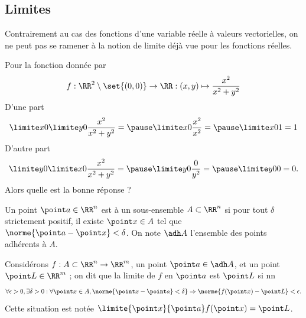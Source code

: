 \subsection{Limites}
\begin{frame}
  \begin{remark*}
    Contrairement au cas des fonctions d'une variable réelle à valeurs vectorielles, on ne peut pas se ramener à la notion de limite déjà vue pour les fonctions réelles.
  \end{remark*}\pause{}

  \begin{example}
    Pour la fonction donnée par
    \begin{equation*}
      f : \RR^{2}\setminus\set{(0,0)} \to \RR : (x,y) \mapsto \frac{x^{2}}{x^{2} + y^{2}}
    \end{equation*}
    D'une part
    \begin{equation*}
      \limite x 0  \limite y 0  \frac{x^{2}}{x^{2} + y^{2}} = \pause
      \limite x 0   \frac{x^{2}}{x^{2}} = \pause
      \limite x 0 1 = 1
    \end{equation*}\pause{}
    D'autre part
    \begin{equation*}
      \limite y 0 \limite x 0  \frac{x^{2}}{x^{2} + y^{2}} = \pause
      \limite y 0 \frac{0}{y^{2}} = \pause
      \limite y 0 0 = 0.
    \end{equation*}\pause{}
    Alors quelle est la bonne réponse ?
  \end{example}
\end{frame}
\begin{frame}
\begin{definition}
  Un point \(\point a \in \RR^{n}\) est  à un sous-ensemble \(A\subset \RR^{n}\) si\pause{} pour tout \(\delta\) strictement positif, il existe \(\point x \in A\) tel que \(\norme{\point a-\point x}< \delta\).\pause{} On note \(\adh A\) l'ensemble des points adhérents à \(A\).
\end{definition}\pause{}
\begin{definition}
  Considérons \(f : A \subset \RR^{n} \to \RR^{m}\), un point \(\point a \in \adh A\), et un point \(\point L \in \RR^{m}\)\pause{} ; on dit que la limite de \(f\) en \(\point a\) est \(\point L\) si\pause{}
nn  \begin{equation*}
    \forall \epsilon > 0, \exists \delta > 0 : \forall \point x \in A, \norme{\point x - \point a} < \delta\} \Rightarrow \norme{f(\point x) - \point L} < \epsilon.
  \end{equation*}\pause{}
  Cette situation est notée \(\limite {\point x}{\point a} f(\point x) = \point L\).
\end{definition}
\end{frame}

